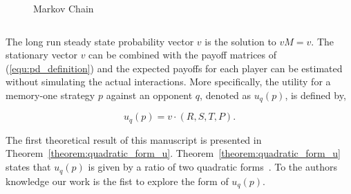 \documentclass[10pt]{article}
\begin{document}
\begin{figure}
    \centering
    
    \caption{Markov Chain}
    \label{fig:markov_chain}
\end{figure}

\begin{equation}\label{eq:transition_matrix}
    
\end{equation}

The long run steady state probability vector \(v\) is the solution to \(v M = v\). The
stationary vector \(v\) can be combined with the payoff matrices of
(\ref{equ:pd_definition}) and the expected payoffs for each player
can be estimated without simulating the actual interactions. More
specifically, the utility for a memory-one strategy \(p\) against an opponent \(q\),
denoted as \(u_q(p)\), is defined by,

\begin{equation}\label{eq:press_dyson_utility}
    u_q(p) = v \cdot (R, S, T, P).
\end{equation}

The first theoretical result of this manuscript is presented in
Theorem~\ref{theorem:quadratic_form_u}. Theorem~\ref{theorem:quadratic_form_u}
states that \(u_q(p)\) is given by a ratio of two quadratic
forms~\cite{kepner2011}. To the authors knowledge our work is the fist to explore
the form of \(u_q(p)\).
\end{document}
